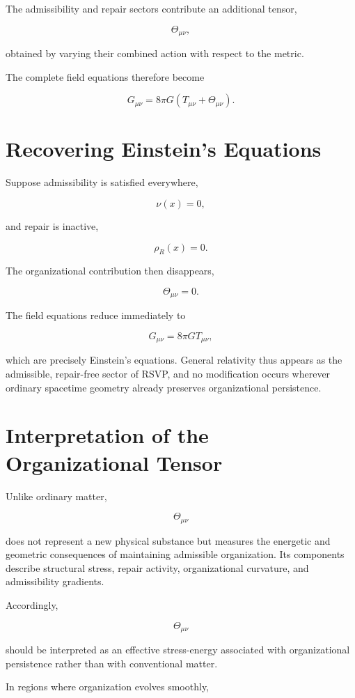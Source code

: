 \documentclass[11pt,oneside]{book}
\numberwithin{equation}{chapter}
\theoremstyle{definition}
\theoremstyle{plain}
\begin{document}
The admissibility and repair sectors contribute an additional tensor,

\[
\Theta_{\mu\nu},
\]

obtained by varying their combined action with respect to the metric.

The complete field equations therefore become

\[
\boxed{
G_{\mu\nu}
=
8\pi G
\left(
T_{\mu\nu}
+
\Theta_{\mu\nu}
\right).
}
\]

\section{Recovering Einstein's Equations}

Suppose admissibility is satisfied everywhere,

\[
\nu(x)=0,
\]

and repair is inactive,

\[
\rho_R(x)=0.
\]

The organizational contribution then disappears,

\[
\Theta_{\mu\nu}=0.
\]

The field equations reduce immediately to

\[
\boxed{
G_{\mu\nu}
=
8\pi G
T_{\mu\nu},
}
\]

which are precisely Einstein's equations. General relativity thus appears as the admissible, repair-free sector of RSVP, and no modification occurs wherever ordinary spacetime geometry already preserves organizational persistence.

\section{Interpretation of the Organizational Tensor}

Unlike ordinary matter,

\[
\Theta_{\mu\nu}
\]

does not represent a new physical substance but measures the energetic and geometric consequences of maintaining admissible organization. Its components describe structural stress, repair activity, organizational curvature, and admissibility gradients.

Accordingly,

\[
\Theta_{\mu\nu}
\]

should be interpreted as an effective stress-energy associated with
organizational persistence rather than with conventional matter.

In regions where organization evolves smoothly,
\end{document}
